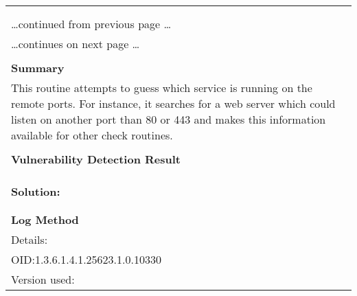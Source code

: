 \documentclass{article}
\begin{document}
\begin{longtable}{|p{}|}
\hline
\rowcolor{gvm_log}{\color{white}{Log (CVSS: 0.0) }}\\
\rowcolor{gvm_log}{\color{white}{NVT: Services}}\\
\hline
\endfirsthead
\hfill\ldots continued from previous page \ldots \\
\hline
\endhead
\hline
\ldots continues on next page \ldots \\
\endfoot
\hline
\endlastfoot
\\
\textbf{Summary}\\
This routine attempts to guess which service is running on the
  remote ports. For instance, it searches for a web server which could listen on another port than
  80 or 443 and makes this information available for other check routines.\\

        \hline
        \\
\textbf{Vulnerability Detection Result}\\
\rowcolor{white}{\verb=An unknown service is running on this port.=}\\
\rowcolor{white}{\verb=It is usually reserved for Postgres=}\\

          \hline
          \\
\textbf{Solution:}\\
\\


        \hline
        \\
\textbf{Log Method}\\
Details:
\rowcolor{white}{\verb=Services=}\\
OID:1.3.6.1.4.1.25623.1.0.10330\\
Version used:
\rowcolor{white}{\verb=2021-03-15T10:42:03Z=}\\
\end{longtable}
\end{document}

